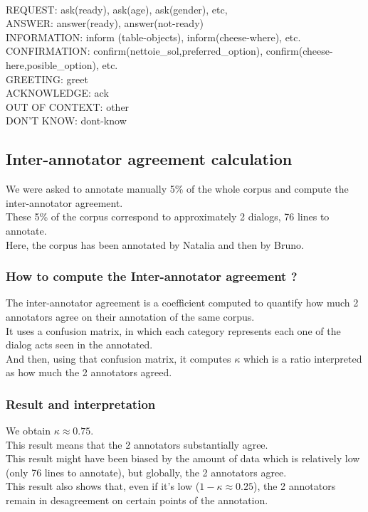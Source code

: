 \documentclass[a4paper]{article}
\begin{document}
\\
REQUEST: ask(ready), ask(age), ask(gender), etc,\\
ANSWER: answer(ready), answer(not-ready)\\
INFORMATION: inform (table-objects), inform(cheese-where), etc.\\
CONFIRMATION: confirm(nettoie\_sol,preferred\_option), confirm(cheese-here,posible\_option), etc.\\
GREETING: greet\\
ACKNOWLEDGE: ack\\
OUT OF CONTEXT: other\\
DON'T KNOW: dont-know\\




\subsection{Inter-annotator agreement calculation}
We were asked to annotate manually 5\% of the whole corpus and compute the inter-annotator agreement.\\
These 5\% of the corpus correspond to approximately 2 dialogs, 76 lines to annotate.\\
Here, the corpus has been annotated by Natalia and then by Bruno.

\subsubsection{How to compute the Inter-annotator agreement ?}
The inter-annotator agreement is a coefficient computed to quantify how much 2 annotators agree on their annotation of the same corpus.\\
It uses a confusion matrix, in which each category represents each one of the dialog acts seen in the annotated.\\
And then, using that confusion matrix, it computes $\kappa$ which is a ratio interpreted as how much the 2 annotators agreed.

\subsubsection{Result and interpretation}
We obtain $\kappa \approx 0.75$.\\
This result means that the 2 annotators substantially agree.\\
This result might have been biased by the amount of data which is relatively low (only 76 lines to annotate), but globally, the 2 annotators agree.\\
This result also shows that, even if it's low ($1 - \kappa \approx 0.25$), the 2 annotators remain in desagreement on certain points of the annotation.
\end{document}
